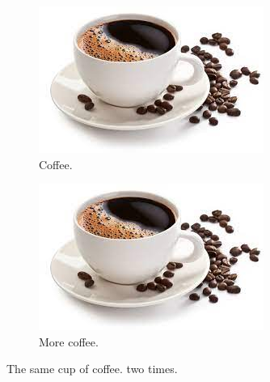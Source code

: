 \documentclass{article}
\begin{document}
	\begin{figure}[h!]
		\centering
		\begin{subfigure}[b]{0.4\linewidth}
			
			\includegraphics[width=\linewidth]{coffee.jpg}
			\caption{Coffee.}
		\end{subfigure}
		\begin{subfigure}[b]{0.4\linewidth}
			
		\includegraphics[width=\linewidth]{coffee.jpg}
		\caption{More coffee.}
		\end{subfigure}
		\caption{The same cup of coffee. two times.}
		\label{fig:coffee}
	\end{figure}
	
\end{document}
